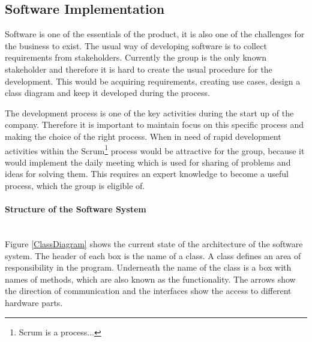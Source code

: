 \subsection{Software Implementation}
Software is one of the essentials of the product, it is also one of the challenges for the business to exist. 
The usual way of developing software is to collect requirements from stakeholders. 
Currently the group is the only known stakeholder and therefore it is hard to create the usual procedure for the development. This would be acquiring requirements, creating use cases, design a class diagram and keep it developed during the process. 

The development process is one of the key activities during the start up of the company. Therefore it is important to maintain focus on this specific process and making the choice of the right process. When in need of rapid development activities within the Scrum\footnote{Scrum is a process...}  process would be attractive for the group, because it would implement the daily meeting which is used for sharing of problems and ideas for solving them. This requires an expert knowledge to become a useful process, which the group is eligible of.

\paragraph*{Structure of the Software System}~\\
Figure \ref{ClassDiagram} shows the current state of the architecture of the software system. The header of each box is the name of a class. A class defines an area of responsibility in the program. 
Underneath the name of the class is a box with 
names of methods, which are also known as the functionality. The arrows show the direction of communication and the interfaces show the access to different hardware parts.

